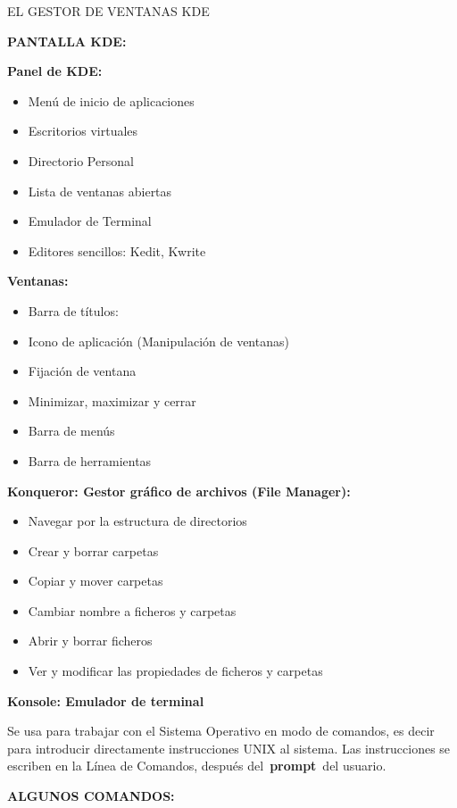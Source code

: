 \documentclass[
  jou,
  floatsintext,
  longtable,
  a4paper,
  nolmodern,
  notxfonts,
  notimes,
  12pt,
  colorlinks=true,linkcolor=blue,citecolor=blue,urlcolor=blue]{apa7}
\providecommand{\tightlist}{%
  \setlength{\itemsep}{0pt}\setlength{\parskip}{0pt}}
\begin{document}
EL GESTOR DE VENTANAS KDE

\textbf{PANTALLA KDE:}

\textbf{Panel de KDE:}

\begin{itemize}
\tightlist
\item
  Menú de inicio de aplicaciones
\item
  Escritorios virtuales
\item
  Directorio Personal
\item
  Lista de ventanas abiertas
\item
  Emulador de Terminal
\item
  Editores sencillos: Kedit, Kwrite
\end{itemize}

\textbf{Ventanas:}

\begin{itemize}
\item
  Barra de títulos:
\item
  Icono de aplicación (Manipulación de ventanas)
\item
  Fijación de ventana
\item
  Minimizar, maximizar y cerrar
\item
  Barra de menús
\item
  Barra de herramientas
\end{itemize}

\textbf{Konqueror: Gestor gráfico de archivos (File Manager):}

\begin{itemize}
\tightlist
\item
  Navegar por la estructura de directorios
\item
  Crear y borrar carpetas
\item
  Copiar y mover carpetas
\item
  Cambiar nombre a ficheros y carpetas
\item
  Abrir y borrar ficheros
\item
  Ver y modificar las propiedades de ficheros y carpetas
\end{itemize}

\textbf{Konsole: Emulador de terminal}

Se usa para trabajar con el Sistema Operativo en modo de comandos, es
decir para introducir directamente instrucciones UNIX al sistema. Las
instrucciones se escriben en la Línea de Comandos, después
del~\textbf{prompt}~del usuario.

\textbf{ALGUNOS COMANDOS:}
\end{document}
